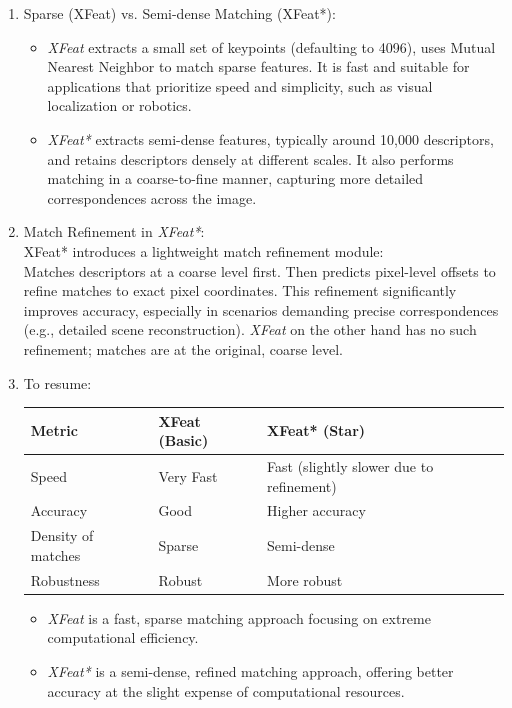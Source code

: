 \begin{enumerate}
    \item Sparse (XFeat) vs. Semi-dense Matching (XFeat*):
          \begin{itemize}
              \item \textit{XFeat} extracts a small set of keypoints (defaulting to 4096), uses Mutual Nearest Neighbor to match sparse features. It is fast and suitable for applications that prioritize speed and simplicity, such as visual localization or robotics.
              \item \textit{XFeat*} extracts semi-dense features, typically around 10,000 descriptors, and retains descriptors densely at different scales. It also performs matching in a coarse-to-fine manner, capturing more detailed correspondences across the image.
          \end{itemize}
    \item Match Refinement in \textit{XFeat*}: \\ XFeat* introduces a lightweight match
          refinement module: \\ Matches descriptors at a coarse level first. Then
          predicts pixel-level offsets to refine matches to exact pixel coordinates. This
          refinement significantly improves accuracy, especially in scenarios demanding
          precise correspondences (e.g., detailed scene reconstruction). \textit{XFeat}
          on the other hand has no such refinement; matches are at the original, coarse
          level.
    \item To resume: \\ {\footnotesize
          \begin{tabular}{|l|l|l|}
              \hline
              Metric             & XFeat (Basic) & XFeat* (Star)                            \\
              \hline
              Speed              & Very Fast     & Fast (slightly slower due to refinement) \\
              \hline
              Accuracy           & Good          & Higher accuracy                          \\
              \hline
              Density of matches & Sparse        & Semi-dense                               \\
              \hline
              Robustness         & Robust        & More robust                              \\
              \hline
          \end{tabular}
          }
          \begin{itemize}
              \item \textit{XFeat} is a fast, sparse matching approach focusing on extreme computational efficiency.
              \item \textit{XFeat*} is a semi-dense, refined matching approach, offering better accuracy at the slight expense of computational resources.
          \end{itemize}
\end{enumerate}
